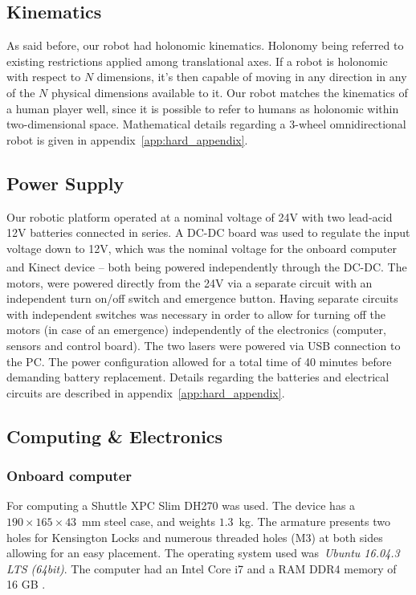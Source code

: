 \subsection{Kinematics}
As said before, our robot had holonomic kinematics. Holonomy being referred to existing restrictions applied among translational axes. If a robot is holonomic with respect to $N$ dimensions, it's then capable of moving in any direction in any of the $N$ physical dimensions available to it. Our robot  matches the kinematics of a human player well, since it is possible to refer to humans as holonomic within two-dimensional space. Mathematical details regarding a 3-wheel omnidirectional robot is given in appendix~\ref{app:hard_appendix}.

\subsection{Power Supply}
Our robotic platform operated at a nominal voltage of 24V with two lead-acid 12V batteries connected in series. A DC-DC board was used to regulate the input voltage down to 12V, which was the nominal voltage for the onboard computer and Kinect\textsuperscript{\textregistered} device -- both being powered independently through the DC-DC. The motors, were powered directly from the 24V via a separate circuit with an independent turn on/off switch and emergence button. Having separate circuits with independent switches was necessary in order to allow for turning off the motors (in case of an emergence) independently of the electronics (computer, sensors and control board). The two lasers were powered via USB connection to the PC. The power  configuration allowed for a total time of 40 minutes before demanding battery replacement. Details regarding the batteries and electrical circuits are described in appendix~\ref{app:hard_appendix}.

\subsection{Computing \& Electronics}
\subsubsection{Onboard computer}\label{onboard pc}
For computing a Shuttle XPC Slim DH270 was used. The device has a $190 \times 165 \times 43$~mm steel case, and weights $1.3$~kg.  The armature presents two holes for Kensington Locks and numerous threaded holes (M3) at both sides allowing for an easy placement. The operating system used was~\textit{Ubuntu 16.04.3 LTS (64bit)}. The computer had an Intel Core i7 and a RAM DDR4 memory of 16 GB .

